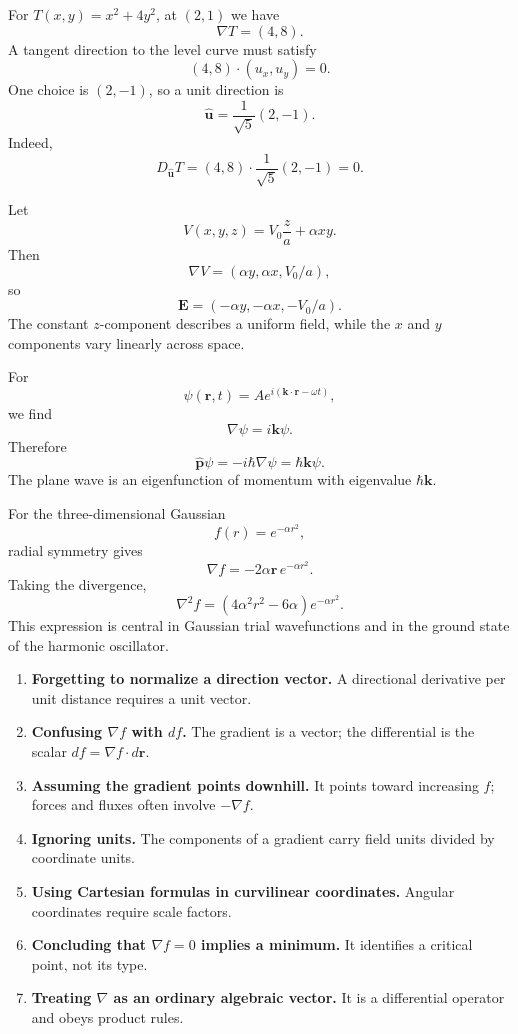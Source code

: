 \begin{bookexample}
For $T(x,y)=x^2+4y^2$, at $(2,1)$ we have
\[
\nabla T=(4,8).
\]
A tangent direction to the level curve must satisfy
\[
(4,8)\cdot(u_x,u_y)=0.
\]
One choice is $(2,-1)$, so a unit direction is
\[
\hat{\mathbf u}=\frac{1}{\sqrt5}(2,-1).
\]
Indeed,
\[
D_{\hat{\mathbf u}}T
=(4,8)\cdot\frac{1}{\sqrt5}(2,-1)=0.
\]
\end{bookexample}

\begin{bookexample}
Let
\[
V(x,y,z)=V_0\frac{z}{a}+\alpha xy.
\]
Then
\[
\nabla V=(\alpha y,\alpha x,V_0/a),
\]
so
\[
\mathbf E=(-\alpha y,-\alpha x,-V_0/a).
\]
The constant $z$-component describes a uniform field, while the $x$ and $y$ components vary linearly across space.
\end{bookexample}

\begin{bookexample}
For
\[
\psi(\mathbf r,t)=A e^{i(\mathbf k\cdot\mathbf r-\omega t)},
\]
we find
\[
\nabla\psi=i\mathbf k\psi.
\]
Therefore
\[
\hat{\mathbf p}\psi
=-i\hbar\nabla\psi
=\hbar\mathbf k\psi.
\]
The plane wave is an eigenfunction of momentum with eigenvalue $\hbar\mathbf k$.
\end{bookexample}

\begin{bookexample}
For the three-dimensional Gaussian
\[
f(r)=e^{-\alpha r^2},
\]
radial symmetry gives
\[
\nabla f=-2\alpha\mathbf r\,e^{-\alpha r^2}.
\]
Taking the divergence,
\[
\nabla^2f
=\left(4\alpha^2r^2-6\alpha\right)e^{-\alpha r^2}.
\]
This expression is central in Gaussian trial wavefunctions and in the ground state of the harmonic oscillator.
\end{bookexample}


\begin{enumerate}
\item \textbf{Forgetting to normalize a direction vector.} A directional derivative per unit distance requires a unit vector.
\item \textbf{Confusing $\nabla f$ with $df$.} The gradient is a vector; the differential is the scalar $df=\nabla f\cdot d\mathbf r$.
\item \textbf{Assuming the gradient points downhill.} It points toward increasing $f$; forces and fluxes often involve $-\nabla f$.
\item \textbf{Ignoring units.} The components of a gradient carry field units divided by coordinate units.
\item \textbf{Using Cartesian formulas in curvilinear coordinates.} Angular coordinates require scale factors.
\item \textbf{Concluding that $\nabla f=0$ implies a minimum.} It identifies a critical point, not its type.
\item \textbf{Treating $\nabla$ as an ordinary algebraic vector.} It is a differential operator and obeys product rules.
\end{enumerate}

